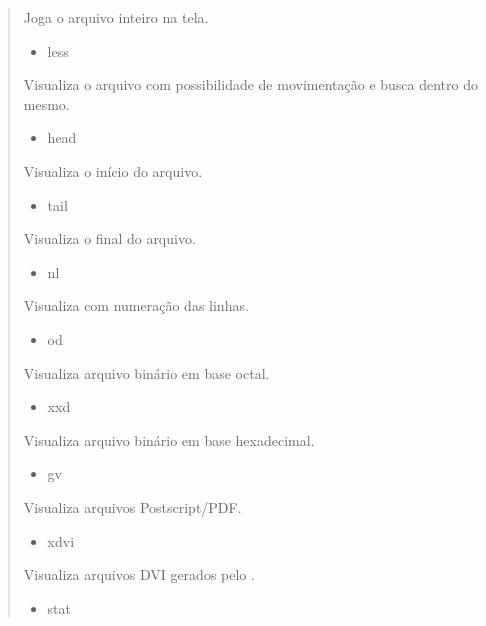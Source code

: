 \documentclass[a4paper,10pt,portuguese]{sphinxmanual}
\begin{document}
\begin{quote}
\begin{description}
\begin{itemize}
\end{itemize}

Joga o arquivo inteiro na tela.
\begin{itemize}
\item {} 
less

\end{itemize}

Visualiza o arquivo com possibilidade de movimentação e busca
dentro do mesmo.
\begin{itemize}
\item {} 
head

\end{itemize}

Visualiza o início do arquivo.
\begin{itemize}
\item {} 
tail

\end{itemize}

Visualiza o final do arquivo.
\begin{itemize}
\item {} 
nl

\end{itemize}

Visualiza com numeração das linhas.
\begin{itemize}
\item {} 
od

\end{itemize}

Visualiza arquivo binário em base octal.
\begin{itemize}
\item {} 
xxd

\end{itemize}

Visualiza arquivo binário em base hexadecimal.
\begin{itemize}
\item {} 
gv

\end{itemize}

Visualiza arquivos Postscript/PDF.
\begin{itemize}
\item {} 
xdvi

\end{itemize}

Visualiza arquivos DVI gerados pelo .
\begin{itemize}
\item {} 
stat

\end{itemize}


\end{description}
\end{quote}
\end{document}
